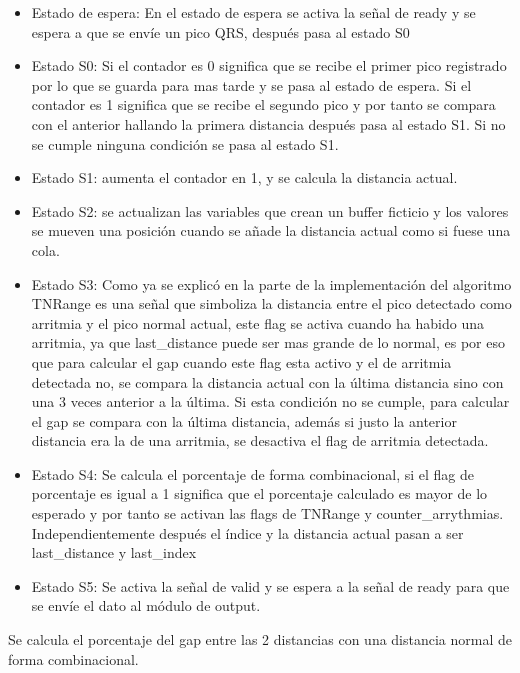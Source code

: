 \begin{itemize}
    \item Estado de espera: En el estado de espera se activa la señal de ready y se espera a que se envíe un pico QRS, después pasa al estado S0
    \item Estado S0: Si el contador es 0 significa que se recibe el primer pico registrado por lo que se guarda para mas tarde y se pasa al estado de espera.
    Si el contador es 1 significa que se recibe el segundo pico y por tanto se compara con el anterior hallando la primera distancia después pasa al estado S1.
    Si no se cumple ninguna condición se pasa al estado S1.    
    \item Estado S1: aumenta el contador en 1, y se calcula la distancia actual.
    \item Estado S2: se actualizan las variables que crean un buffer ficticio y los valores se mueven una posición cuando se añade la distancia actual como si fuese una cola.
    \item Estado S3: Como ya se explicó en la parte de la implementación del algoritmo TNRange es una señal que simboliza la distancia entre el pico detectado como arritmia y 
    el pico normal actual, este flag se activa cuando ha habido una arritmia, ya que last\_distance puede ser mas grande de lo normal, es por eso que para calcular el gap cuando este flag esta activo
     y el de arritmia detectada no, se compara la distancia actual con la última distancia sino con una 3 veces anterior a la última. Si esta condición no se cumple, para calcular el gap se compara 
     con la última distancia, además si justo la anterior distancia era la de una arritmia, se desactiva el flag de arritmia detectada.
    \item Estado S4: Se calcula el porcentaje de forma combinacional, si el flag de porcentaje es igual a 1 significa que el porcentaje calculado es mayor de lo esperado y por tanto se activan las flags
    de TNRange y counter\_arrythmias. Independientemente después el índice y la distancia actual pasan a ser last\_distance y last\_index
    \item Estado S5: Se activa la señal de valid y se espera a la señal de ready para que se envíe el dato al módulo de output.
\end{itemize}

Se calcula el porcentaje del gap entre las 2 distancias con una distancia normal de forma combinacional.

